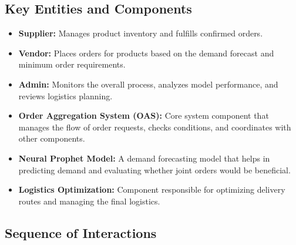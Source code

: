 \subsection{Key Entities and Components}
\begin{itemize}
    \item \textbf{Supplier:} Manages product inventory and fulfills confirmed orders.
    \item \textbf{Vendor:} Places orders for products based on the demand forecast and minimum order requirements.
    \item \textbf{Admin:} Monitors the overall process, analyzes model performance, and reviews logistics planning.
    \item \textbf{Order Aggregation System (OAS):} Core system component that manages the flow of order requests, checks conditions, and coordinates with other components.
    \item \textbf{Neural Prophet Model:} A demand forecasting model that helps in predicting demand and evaluating whether joint orders would be beneficial.
    \item \textbf{Logistics Optimization:} Component responsible for optimizing delivery routes and managing the final logistics.
\end{itemize}
\subsection{Sequence of Interactions}

